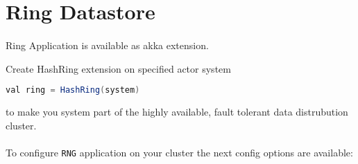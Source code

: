 \section{Ring Datastore}
\paragraph{}
Ring Application is available as akka extension. 

Create HashRing extension on specified actor system
\begin{lstlisting}[language=Java]
val ring = HashRing(system)
\end{lstlisting}
to make you system part of the highly available, fault tolerant data distrubution cluster.

\paragraph{}
To configure \texttt{RNG} application on your cluster the next config options are available:

